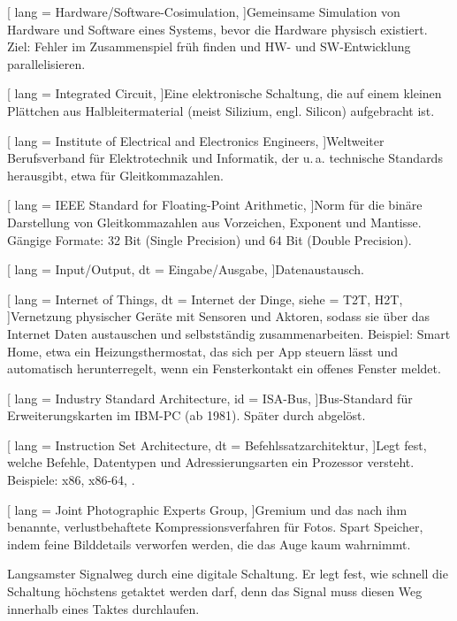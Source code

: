 [
  lang  = Hardware/Software-Cosimulation,
]{Gemeinsame Simulation von Hardware und Software eines Systems, bevor die Hardware physisch existiert. Ziel: Fehler im Zusammenspiel früh finden und HW- und SW-Entwicklung parallelisieren.}

[
  lang  = Integrated Circuit,
]{Eine elektronische Schaltung, die auf einem kleinen Plättchen aus Halbleitermaterial (meist Silizium, engl. Silicon) aufgebracht ist.}

[
  lang  = Institute of Electrical and Electronics Engineers,
]{Weltweiter Berufsverband für Elektrotechnik und Informatik, der u.\,a. technische Standards herausgibt, etwa  für Gleitkommazahlen.}

[
  lang  = IEEE Standard for Floating-Point Arithmetic,
]{Norm für die binäre Darstellung von Gleitkommazahlen aus Vorzeichen, Exponent und Mantisse. Gängige Formate: 32 Bit (Single Precision) und 64 Bit (Double Precision).}

[
  lang  = Input/Output,
  dt    = Eingabe/Ausgabe,
]{Datenaustausch.}

[
  lang  = Internet of Things,
  dt    = Internet der Dinge,
  siehe = {T2T, H2T},
]{Vernetzung physischer Geräte mit Sensoren und Aktoren, sodass sie über das Internet Daten austauschen und selbstständig zusammenarbeiten. Beispiel: Smart Home, etwa ein Heizungsthermostat, das sich per App steuern lässt und automatisch herunterregelt, wenn ein Fensterkontakt ein offenes Fenster meldet.}

[
  lang  = Industry Standard Architecture,
  id    = ISA-Bus,
]{Bus-Standard für Erweiterungskarten im IBM-PC (ab 1981). Später durch  abgelöst.}

[
  lang  = Instruction Set Architecture,
  dt    = Befehlssatzarchitektur,
]{Legt fest, welche Befehle, Datentypen und Adressierungsarten ein Prozessor versteht. Beispiele: x86, x86-64, .}

[
  lang  = Joint Photographic Experts Group,
]{Gremium und das nach ihm benannte, verlustbehaftete Kompressionsverfahren für Fotos. Spart Speicher, indem feine Bilddetails verworfen werden, die das Auge kaum wahrnimmt.}

    {Langsamster Signalweg durch eine digitale Schaltung. Er legt fest, wie schnell die Schaltung höchstens getaktet werden darf, denn das Signal muss diesen Weg innerhalb eines Taktes durchlaufen.}

